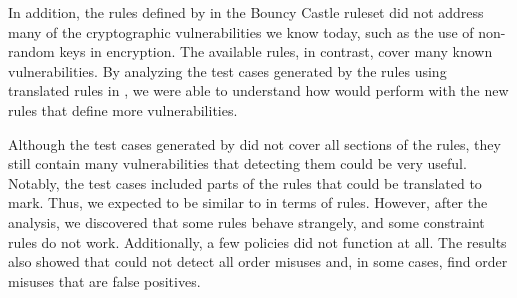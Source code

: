 In addition, the rules defined by \MARK{} in the Bouncy Castle ruleset did not address many of the cryptographic vulnerabilities we know today, such as the use of non-random keys in encryption. The available \crysl{} rules, in contrast, cover many known vulnerabilities. By analyzing the test cases generated by the \crysl{} rules using translated \MARK{} rules in \codyze, we were able to understand how \codyze{} would perform with the new rules that define more vulnerabilities. 


Although the test cases generated by \cognicrypttestgen{} did not cover all sections of the \crysl{} rules, they still contain many vulnerabilities that detecting them could be very useful. Notably, the test cases included parts of the \crysl{} rules that could be translated to mark. Thus, we expected \codyze{} to be similar to \cognicryptsast{} in terms of rules. However, after the analysis, we discovered that some rules behave strangely, and some constraint rules do not work. Additionally, a few \MARK{} policies did not function at all. The results also showed that \cognicryptsast{} could not detect all order misuses and, in some cases, find order misuses that are false positives.

